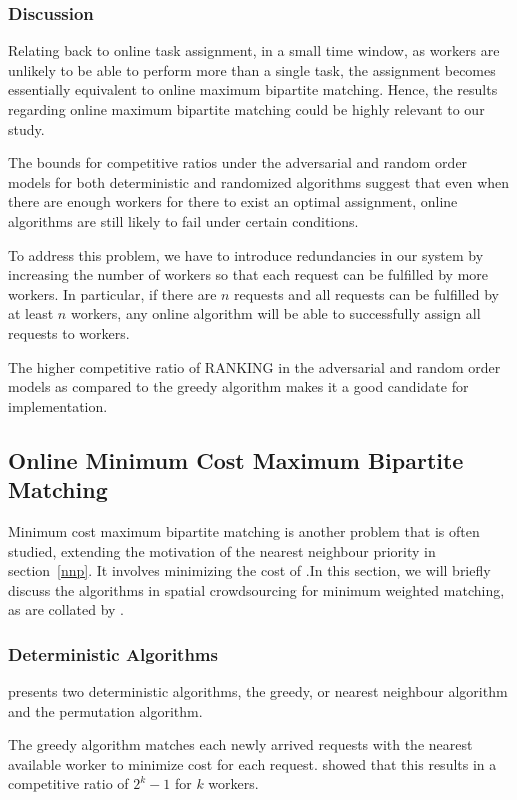 \documentclass[urop]{nurop}
\begin{document}
\subsubsection{Discussion}
Relating back to online task assignment, in a small time window, as workers are unlikely to be able to perform more than a single task, the assignment becomes essentially equivalent to online maximum bipartite matching. Hence, the results regarding online maximum bipartite matching could be highly relevant to our study.  

The bounds for competitive ratios under the adversarial and random order models for both deterministic and randomized algorithms suggest that even when there are enough workers for there to exist an optimal assignment, online algorithms are still likely to fail under certain conditions. 

To address this problem, we have to introduce redundancies in our system by increasing the number of workers so that each request can be fulfilled by more workers. In particular, if there are $n$ requests and all requests can be fulfilled by at least $n$ workers, any online algorithm will be able to successfully assign all requests to workers. 

The higher competitive ratio of RANKING in the adversarial and random order models as compared to the greedy algorithm makes it a good candidate for implementation.


\subsection{Online Minimum Cost Maximum Bipartite Matching}
Minimum cost maximum bipartite matching is another problem that is often studied, extending the motivation of the nearest neighbour priority in section~\ref{nnp}. It involves minimizing the cost of .In this section, we will briefly discuss the algorithms in spatial crowdsourcing for minimum weighted matching, as are collated by \cite{tong}.
\subsubsection{Deterministic Algorithms}
\cite{greedy} presents two deterministic algorithms, the greedy, or nearest neighbour algorithm and the permutation algorithm.

The greedy algorithm matches each newly arrived requests with the nearest available worker to minimize cost for each request. \cite{greedy} showed that this results in a competitive ratio of $2^k - 1$ for $k$ workers.
\end{document}
